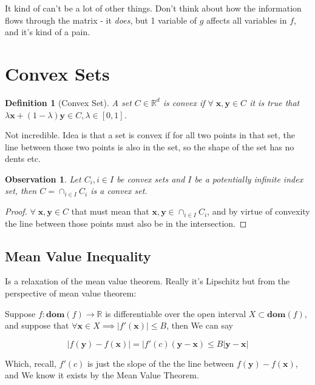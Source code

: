 \documentclass{article}
\newtheorem{definition}[theorem]{Definition}
\newtheorem{observation}[theorem]{Observation}
\begin{document}
		It kind of can't be a lot of other things. Don't think about how the information flows through the matrix - it \textit{does}, but 1 variable of $g$ affects all variables in $f$, and it's kind of a pain. 
		
\section{Convex Sets}

	\begin{definition}[Convex Set]
		A set $C\in\mathbb{R}^d$ is \textnormal{convex} if $\forall\;\mathbf{x, y}\in C$ it is true that $\lambda\mathbf{x} + (1-\lambda)\mathbf{y}\in C, \lambda\in [0,1]$.
	\end{definition}
	
	Not incredible. Idea is that a set is convex if for all two points in that set, the line between those two points is also in the set, so the shape of the set has no dents etc.
	
	\begin{observation}
		Let $C_i, i\in I$ be convex sets and $I$ be a potentially infinite index set, then $C = \cap_{i\in I} C_i $ is a convex set.
	\end{observation}
	
	\begin{proof}
		$\forall\;\mathbf{x, y}\in C$ that must mean that $\mathbf{x, y}\in \cap_{i\in I} C_i$, and by virtue of convexity the line between those points must also be in the intersection.
	\end{proof}
		
	\subsection{Mean Value Inequality}
	
		Is a relaxation of the mean value theorem. Really it's Lipschitz but from the perspective of mean value theorem:
		
		Suppose $f:\mathbf{dom}(f)\to\mathbb{R}$ is differentiable over the open interval $X\subset\mathbf{dom}(f)$, and suppose that $\forall\mathbf{x}\in X \implies |f'(\mathbf{x})| \le B$, then We can say
		
		\[ |f(\mathbf{y}) - f(\mathbf{x})| = |f'(c)(\mathbf{y-x}) \le B|\mathbf{y-x}| \]
		
		Which, recall, $f'(c)$ is just the slope of the the line between $f(\mathbf{y}) - f(\mathbf{x})$, and We know it exists by the Mean Value Theorem.
		
\end{document}
